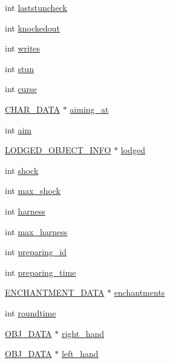 \begin{DoxyCompactItemize}
int \hyperlink{structchar__data_a7e246597b82a9d6b9ec2acc3dde3275f}{laststuncheck}
\item 
int \hyperlink{structchar__data_a9e2221b2d405f28c30071edd530adf06}{knockedout}
\item 
int \hyperlink{structchar__data_a13b9829dae4a284cb0472f5804c7faf4}{writes}
\item 
int \hyperlink{structchar__data_a342f1272b59311c96d7008f45888713e}{stun}
\item 
int \hyperlink{structchar__data_acda20f5812b2e734dee99a68f8fc7af2}{curse}
\item 
\hyperlink{structs_8h_af33ed1e66e8541a08bed257124f50f31}{C\-H\-A\-R\-\_\-\-D\-A\-T\-A} $\ast$ \hyperlink{structchar__data_a341c2eb7bc677eec613148ef7cb636d5}{aiming\-\_\-at}
\item 
int \hyperlink{structchar__data_abd65775c62e3fde71c70527bce24b1b5}{aim}
\item 
\hyperlink{structs_8h_aa299ea0a69d123edbc3b581b10115e2b}{L\-O\-D\-G\-E\-D\-\_\-\-O\-B\-J\-E\-C\-T\-\_\-\-I\-N\-F\-O} $\ast$ \hyperlink{structchar__data_ae58dd2f4f4945c5d1461ef240376aef9}{lodged}
\item 
int \hyperlink{structchar__data_a3c720bdd1b4a14ab8eed1d46509b9c61}{shock}
\item 
int \hyperlink{structchar__data_a6f740d85354d55a58dd75c02bad9ad41}{max\-\_\-shock}
\item 
int \hyperlink{structchar__data_a7be47f9e35fc6f438dd0544082675b8b}{harness}
\item 
int \hyperlink{structchar__data_a6abd5274e9c47b28568270d8fffa2542}{max\-\_\-harness}
\item 
int \hyperlink{structchar__data_aa4e19f32ec4058bbcf5ed409ca0ddae7}{preparing\-\_\-id}
\item 
int \hyperlink{structchar__data_a51ab2615e2a97987ecae3f4d64efd044}{preparing\-\_\-time}
\item 
\hyperlink{structs_8h_aa9887f2349529f20dd17249da8b9f960}{E\-N\-C\-H\-A\-N\-T\-M\-E\-N\-T\-\_\-\-D\-A\-T\-A} $\ast$ \hyperlink{structchar__data_a5d9e51de423e2eced49e6a2a0ba930d2}{enchantments}
\item 
int \hyperlink{structchar__data_ae02e0ff3bfa907da3a83aa89ff69f8d4}{roundtime}
\item 
\hyperlink{structs_8h_aaa59141dfc8c6ecdb6bfcf1537dd52d1}{O\-B\-J\-\_\-\-D\-A\-T\-A} $\ast$ \hyperlink{structchar__data_a80e146027ae72e35a25309308fe75ff6}{right\-\_\-hand}
\item 
\hyperlink{structs_8h_aaa59141dfc8c6ecdb6bfcf1537dd52d1}{O\-B\-J\-\_\-\-D\-A\-T\-A} $\ast$ \hyperlink{structchar__data_ab469b8fdf57e356ef0e3b9b803639958}{left\-\_\-hand}

\end{DoxyCompactItemize}
